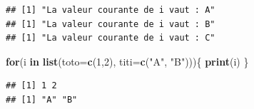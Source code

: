 \documentclass[
  11pt,
]{book}
\newenvironment{Shaded}{\begin{snugshade}}{\end{snugshade}}
\newcommand{\AttributeTok}[1]{\textcolor[rgb]{0.13,0.29,0.53}{#1}}
\newcommand{\ControlFlowTok}[1]{\textcolor[rgb]{0.13,0.29,0.53}{\textbf{#1}}}
\newcommand{\DecValTok}[1]{\textcolor[rgb]{0.00,0.00,0.81}{#1}}
\newcommand{\FunctionTok}[1]{\textcolor[rgb]{0.13,0.29,0.53}{\textbf{#1}}}
\newcommand{\NormalTok}[1]{#1}
\newcommand{\StringTok}[1]{\textcolor[rgb]{0.31,0.60,0.02}{#1}}
\numberwithin{equation}{section}
\numberwithin{countremarque}{section}
\begin{document}
\begin{lstlisting}
## [1] "La valeur courante de i vaut : A"
## [1] "La valeur courante de i vaut : B"
## [1] "La valeur courante de i vaut : C"
\end{lstlisting}

\begin{Shaded}
\begin{Highlighting}[]
\ControlFlowTok{for}\NormalTok{(i }\ControlFlowTok{in} \FunctionTok{list}\NormalTok{(}\AttributeTok{toto=}\FunctionTok{c}\NormalTok{(}\DecValTok{1}\NormalTok{,}\DecValTok{2}\NormalTok{), }\AttributeTok{titi=}\FunctionTok{c}\NormalTok{(}\StringTok{"A"}\NormalTok{, }\StringTok{"B"}\NormalTok{)))\{}
  \FunctionTok{print}\NormalTok{(i)}
\NormalTok{\}}
\end{Highlighting}
\end{Shaded}

\begin{lstlisting}
## [1] 1 2
## [1] "A" "B"
\end{lstlisting}
\end{document}
